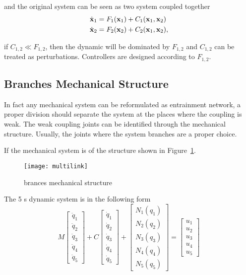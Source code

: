 {and the original system can be seen as two system coupled together
\begin{align}
\dot{\mathbf{x}}_1&=F_1(\mathbf{x}_1)+C_1(\mathbf{x}_1,\mathbf{x}_2)\nonumber\\
\dot{\mathbf{x}}_2&=F_2(\mathbf{x}_2)+C_2(\mathbf{x}_1,\mathbf{x}_2),\nonumber
\end{align}

if $C_{1,2} \ll F_{1,2}$, then the dynamic will be dominated by $F_{1,2}$ and $C_{1,2}$ can be treated as perturbations.
Controllers are designed according to $F_{1,2}$.

\subsection*{Branches Mechanical Structure}
In fact any mechanical system can be reformulated as entrainment network,
a proper division should separate the system at the places where the coupling is weak.
The weak coupling joints can be identified through the mechanical structure.
Usually, the joints where the system branches are a proper choice.

If the mechanical system is of  the structure shown in Figure~\ref{fig:brancefigure}.
\begin{figure}[!htbp]
  \begin{center}
      \texttt{[image: multilink]}
    \caption{brances mechanical structure}
    \label{fig:brancefigure}
\end{center}
\end{figure}

The  5 {\dof}s dynamic system is in the following form
\[
M\left[\begin{array}{c}
\ddot{q}_{1}\\
\ddot{q}_{2}\\
\ddot{q}_{3}\\
\ddot{q}_{4}\\
\ddot{q}_{5}\end{array}\right]+C\left[\begin{array}{c}
\dot{q}_{1}\\
\dot{q}_{2}\\
\dot{q}_{3}\\
\dot{q}_{4}\\
\dot{q}_{5}\end{array}\right]+\left[\begin{array}{c}
N_{1}(q_{1})\\
N_{2}(q_{2})\\
N_{3}(q_{3})\\
N_{4}(q_{4})\\
N_{5}(q_{5})\end{array}\right]=\left[\begin{array}{c}
u_{1}\\
u_{2}\\
u_{3}\\
u_{4}\\
u_{5}\end{array}\right]
\]

}
